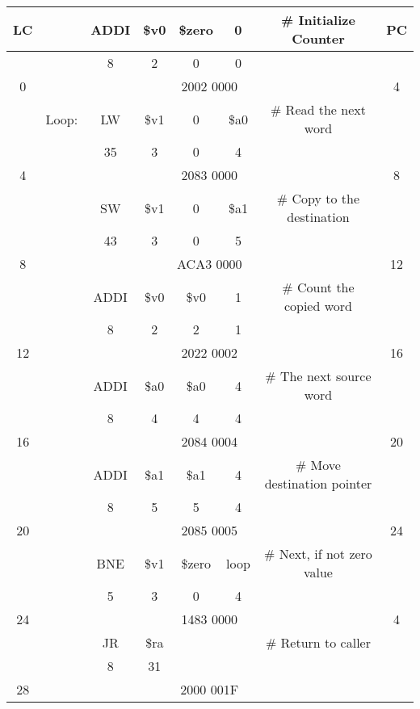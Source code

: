 \documentclass[a4paper,11pt]{article}
\begin{document}
\begin{tabular}{ | c | c | c | c | c | c | c | c | }
  \hline
    LC & & ADDI & \$v0 & \$zero & 0 & \# Initialize Counter & PC \\ \hline
          & & 8 & 2 & 0 & 0 &   &   \\ \hline
     0   &   \multicolumn{6}{|c|}{2002 0000} & 4 \\ \hline
          & Loop: & LW & \$v1 & 0 & \$a0 & \# Read the next word &  \\ \hline
          & & 35 & 3 & 0 & 4 &   &   \\ \hline
     4   &   \multicolumn{6}{|c|}{2083 0000} & 8 \\ \hline
          & & SW & \$v1 & 0 & \$a1 & \# Copy to the destination &  \\ \hline
          & & 43 & 3 & 0 & 5 &   &   \\ \hline
     8   &   \multicolumn{6}{|c|}{ACA3 0000} & 12 \\ \hline
          & & ADDI & \$v0 & \$v0 & 1 & \# Count the copied word &  \\ \hline
          & & 8 & 2 & 2 & 1 &   &   \\ \hline
     12   &   \multicolumn{6}{|c|}{2022 0002} & 16 \\ \hline
          & & ADDI & \$a0 & \$a0 & 4 & \# The next source word &  \\ \hline
          & & 8 & 4 & 4 & 4 &   &   \\ \hline
     16   &   \multicolumn{6}{|c|}{2084 0004} & 20 \\ \hline
          & & ADDI & \$a1 & \$a1 & 4 & \# Move destination pointer &  \\ \hline
          & & 8 & 5 & 5 & 4 &   &   \\ \hline
     20   &   \multicolumn{6}{|c|}{2085 0005} & 24 \\ \hline
          & & BNE& \$v1 & \$zero & loop & \# Next, if not zero value &  \\ \hline
          & & 5 & 3 & 0 & 4 &   &   \\ \hline
     24   &   \multicolumn{6}{|c|}{1483 0000} & 4 \\ \hline
          & & JR & \$ra &  &  & \# Return to caller &  \\ \hline
          & & 8 & 31 & &  &   &   \\ \hline
     28  &   \multicolumn{6}{|c|}{2000 001F} &  \\ \hline
\end{tabular}

\end{document}
